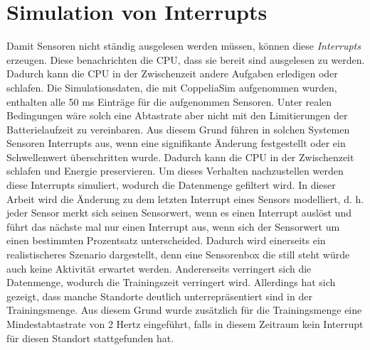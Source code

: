 \section{Simulation von Interrupts}
Damit Sensoren nicht ständig ausgelesen werden müssen, können diese \textit{Interrupts} erzeugen.
Diese benachrichten die CPU, dass sie bereit sind ausgelesen zu werden.
Dadurch kann die CPU in der Zwischenzeit andere Aufgaben erledigen oder schlafen.
\newline
\newline
Die Simulationsdaten, die mit CoppeliaSim aufgenommen wurden, enthalten alle 50 ms Einträge für die aufgenommen Sensoren.
Unter realen Bedingungen wäre solch eine Abtastrate aber nicht mit den Limitierungen der Batterielaufzeit zu vereinbaren.
Aus diesem Grund führen in solchen Systemen Sensoren Interrupts aus, wenn eine signifikante Änderung festgestellt oder ein Schwellenwert überschritten wurde.
Dadurch kann die CPU in der Zwischenzeit schlafen und Energie preservieren.
\newline
\newline
Um dieses Verhalten nachzustellen werden diese Interrupts simuliert, wodurch die Datenmenge gefiltert wird.
In dieser Arbeit wird die Änderung zu dem letzten Interrupt eines Sensors modelliert,
d. h. jeder Sensor merkt sich seinen Sensorwert, wenn es einen Interrupt auslöst
und führt das nächste mal nur einen Interrupt aus, wenn sich der Sensorwert um einen bestimmten Prozentsatz unterscheided.
Dadurch wird einerseits ein realistischeres Szenario dargestellt,
denn eine Sensorenbox die still steht würde auch keine Aktivität erwartet werden.
Andererseits verringert sich die Datenmenge, wodurch die Trainingszeit verringert wird.
\newline
\newline
Allerdings hat sich gezeigt, dass manche Standorte deutlich unterrepräsentiert sind in der Trainingsmenge.
Aus diesem Grund wurde zusätzlich für die Trainingsmenge eine Mindestabtastrate von 2 Hertz eingeführt,
falls in diesem Zeitraum kein Interrupt für diesen Standort stattgefunden hat.